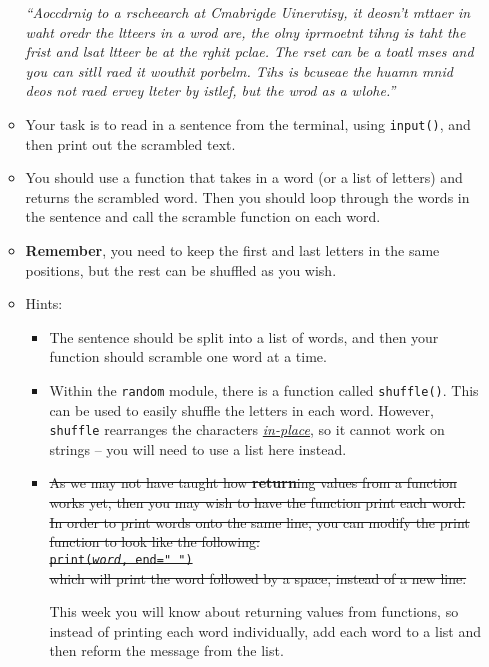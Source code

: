 \documentclass[11pt]{report}
\begin{document}
\begin{enumerate}
\begin{itemize}
		\emph{``Aoccdrnig to a rscheearch at Cmabrigde Uinervtisy, it deosn't mttaer in waht oredr the ltteers in a wrod are, the olny iprmoetnt tihng is taht the frist and lsat ltteer be at the rghit pclae. The rset can be a toatl mses and you can sitll raed it wouthit porbelm. Tihs is bcuseae the huamn mnid deos not raed ervey lteter by istlef, but the wrod as a wlohe.''}\\

		\item Your task is to read in a sentence from the terminal, using {\tt input()}, and then print out the scrambled text.
		\item You should use a function that takes in a word (or a list of letters) and returns the scrambled word. Then you should loop through the words in the sentence and call the scramble function on each word.
		\item \textbf{Remember}, you need to keep the first and last letters in the same positions, but the rest can be shuffled as you wish.
		\item Hints:
		\begin{itemize}
			\item The sentence should be split into a list of words, and then your function should scramble one word at a time.
			\item Within the {\tt random} module, there is a function called {\tt shuffle()}. This can be used to easily shuffle the letters in each word. However, {\tt shuffle} rearranges the characters \href{https://en.wikipedia.org/wiki/In-place_algorithm}{\emph{in-place}}, so it cannot work on strings -- you will need to use a list here instead.
			\item \sout{As we may not have taught how \textbf{return}ing values from a function works yet, then you may wish to have the function print each word. In order to print words onto the same line, you can modify the print function to look like the following:\\
			{\tt print(\emph{word}, end=" ")}\\
			which will print the word followed by a space, instead of a new line.}

			This week you will know about returning values from functions, so instead of printing each word individually, add each word to a list and then reform the message from the list.
		\end{itemize}
	\end{itemize}
\end{enumerate}
\end{document}
